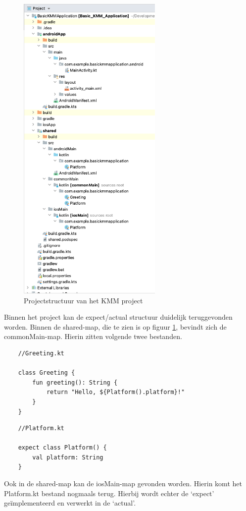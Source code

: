 \begin{figure}
    \centering
    \includegraphics[width=7cm]{img/kmm-structure.png}
    \caption{Projectstructuur van het KMM project}
    \label{fig:M-kmm-stucture}
\end{figure}

Binnen het project kan de expect/actual structuur duidelijk teruggevonden worden. Binnen de shared-map, die te zien is op figuur \ref{fig:M-kmm-stucture}, bevindt zich de commonMain-map. Hierin zitten volgende twee bestanden.

\begin{lstlisting}
    //Greeting.kt
    
    class Greeting {
        fun greeting(): String {
            return "Hello, ${Platform().platform}!"
        }
    }
\end{lstlisting}
\begin{lstlisting}
    //Platform.kt
    
    expect class Platform() {
        val platform: String
    }
\end{lstlisting}

Ook in de shared-map kan de iosMain-map gevonden worden. Hierin komt het Platform.kt bestand nogmaals terug. Hierbij wordt echter de `expect' geïmplementeerd en verwerkt in de `actual'. 

